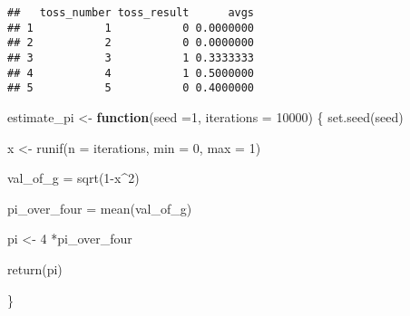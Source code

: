 \documentclass[
]{article}
\newenvironment{Shaded}{\begin{snugshade}}{\end{snugshade}}
\newcommand{\AttributeTok}[1]{\textcolor[rgb]{0.77,0.63,0.00}{#1}}
\newcommand{\ControlFlowTok}[1]{\textcolor[rgb]{0.13,0.29,0.53}{\textbf{#1}}}
\newcommand{\DecValTok}[1]{\textcolor[rgb]{0.00,0.00,0.81}{#1}}
\newcommand{\FunctionTok}[1]{\textcolor[rgb]{0.00,0.00,0.00}{#1}}
\newcommand{\NormalTok}[1]{#1}
\newcommand{\OtherTok}[1]{\textcolor[rgb]{0.56,0.35,0.01}{#1}}
\newcommand{\SpecialCharTok}[1]{\textcolor[rgb]{0.00,0.00,0.00}{#1}}
\begin{document}
\begin{Shaded}
\end{Shaded}

\begin{verbatim}
##   toss_number toss_result      avgs
## 1           1           0 0.0000000
## 2           2           0 0.0000000
## 3           3           1 0.3333333
## 4           4           1 0.5000000
## 5           5           0 0.4000000
\end{verbatim}

\begin{Shaded}
\begin{Highlighting}[]
\NormalTok{estimate\_pi }\OtherTok{\textless{}{-}} \ControlFlowTok{function}\NormalTok{(}\AttributeTok{seed =}\DecValTok{1}\NormalTok{, }\AttributeTok{iterations =} \DecValTok{10000}\NormalTok{) \{}
  \FunctionTok{set.seed}\NormalTok{(seed)}
  
\NormalTok{  x }\OtherTok{\textless{}{-}} \FunctionTok{runif}\NormalTok{(}\AttributeTok{n =}\NormalTok{ iterations, }\AttributeTok{min =} \DecValTok{0}\NormalTok{, }\AttributeTok{max =} \DecValTok{1}\NormalTok{)}
  
\NormalTok{  val\_of\_g }\OtherTok{=} \FunctionTok{sqrt}\NormalTok{(}\DecValTok{1}\SpecialCharTok{{-}}\NormalTok{x}\SpecialCharTok{\^{}}\DecValTok{2}\NormalTok{)}
  
\NormalTok{  pi\_over\_four }\OtherTok{=} \FunctionTok{mean}\NormalTok{(val\_of\_g)}
  
\NormalTok{  pi }\OtherTok{\textless{}{-}} \DecValTok{4} \SpecialCharTok{*}\NormalTok{pi\_over\_four}
  
  \FunctionTok{return}\NormalTok{(pi)}
  
\NormalTok{\}}
\end{Highlighting}
\end{Shaded}
\end{document}
